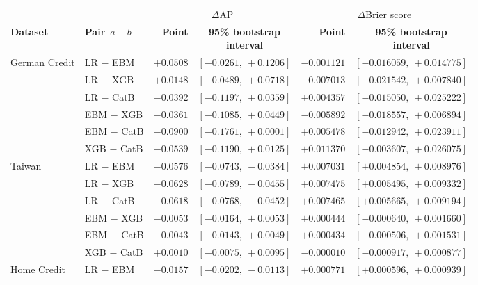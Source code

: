 \begin{table}[!t]
\centering
\fontsize{8.5pt}{10pt}\selectfont
\setlength{\tabcolsep}{2pt}
\begin{tabular}{@{}llrcrc@{}}
\toprule
                 &                     & \multicolumn{2}{c}{$\Delta$AP} & \multicolumn{2}{c}{$\Delta$Brier score} \\
\cmidrule(lr){3-4}\cmidrule(lr){5-6}
\textbf{Dataset} & \textbf{Pair}~$a-b$ & \textbf{Point} & \shortstack{\textbf{95\% bootstrap}\\\textbf{interval}} & \textbf{Point} & \shortstack{\textbf{95\% bootstrap}\\\textbf{interval}} \\
\midrule
German Credit    & LR $-$ EBM   & $+0.0508$ & $[-0.0261,\ +0.1206]$ & $-0.001121$ & $[-0.016059,\ +0.014775]$ \\
                 & LR $-$ XGB   & $+0.0148$ & $[-0.0489,\ +0.0718]$ & $-0.007013$ & $[-0.021542,\ +0.007840]$ \\
                 & LR $-$ CatB  & $-0.0392$ & $[-0.1197,\ +0.0359]$ & $+0.004357$ & $[-0.015050,\ +0.025222]$ \\
                 & EBM $-$ XGB  & $-0.0361$ & $[-0.1085,\ +0.0449]$ & $-0.005892$ & $[-0.018557,\ +0.006894]$ \\
                 & EBM $-$ CatB & $-0.0900$ & $[-0.1761,\ +0.0001]$ & $+0.005478$ & $[-0.012942,\ +0.023911]$ \\
                 & XGB $-$ CatB & $-0.0539$ & $[-0.1190,\ +0.0125]$ & $+0.011370$ & $[-0.003607,\ +0.026075]$ \\
\midrule
Taiwan           & LR $-$ EBM   & $-0.0576$ & $[-0.0743,\ -0.0384]$ & $+0.007031$ & $[+0.004854,\ +0.008976]$ \\
                 & LR $-$ XGB   & $-0.0628$ & $[-0.0789,\ -0.0455]$ & $+0.007475$ & $[+0.005495,\ +0.009332]$ \\
                 & LR $-$ CatB  & $-0.0618$ & $[-0.0768,\ -0.0452]$ & $+0.007465$ & $[+0.005665,\ +0.009194]$ \\
                 & EBM $-$ XGB  & $-0.0053$ & $[-0.0164,\ +0.0053]$ & $+0.000444$ & $[-0.000640,\ +0.001660]$ \\
                 & EBM $-$ CatB & $-0.0043$ & $[-0.0143,\ +0.0049]$ & $+0.000434$ & $[-0.000506,\ +0.001531]$ \\
                 & XGB $-$ CatB & $+0.0010$ & $[-0.0075,\ +0.0095]$ & $-0.000010$ & $[-0.000917,\ +0.000877]$ \\
\midrule
Home Credit      & LR $-$ EBM   & $-0.0157$ & $[-0.0202,\ -0.0113]$ & $+0.000771$ & $[+0.000596,\ +0.000939]$ \\

\end{tabular}
\end{table}
